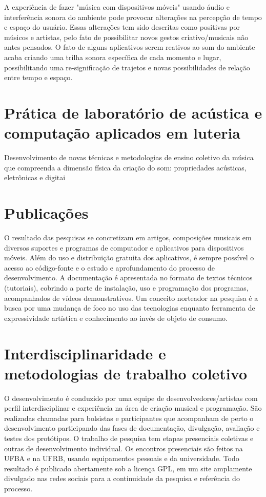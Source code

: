 \documentclass[
	12pt,				%
	openright,			%
	twoside,			%
	a4paper,			%
	english,			%
	french,				%
	spanish,			%
	brazil,				%
	]{abntex2}
\begin{document}
A experiência de fazer "música com dispositivos móveis"\cite{brinkmann2012making} usando áudio e interferência sonora do ambiente pode provocar alterações na percepção de tempo e espaço do usuário. Essas alterações tem sido descritas como positivas por músicos e artistas, pelo fato de possibilitar novos gestos criativo/musicais não antes pensados. O fato de alguns aplicativos serem reativos ao som do ambiente acaba criando uma trilha sonora específica de cada momento e lugar, possibilitando uma re-significação de trajetos e novas possibilidades de relação entre tempo e espaço.

\section{Prática de laboratório de acústica e computação aplicados em luteria}

Desenvolvimento de novas técnicas e metodologias de ensino coletivo da música que compreenda a dimensão física da criação do som: propriedades acústicas, eletrônicas e digitai

\section{Publicações}

O resultado das pesquisas se concretizam em artigos, composições musicais em diversos suportes e programas de computador e aplicativos para dispositivos móveis. Além do uso e distribuição gratuita dos aplicativos, é sempre possível o acesso ao código-fonte e o estudo e aprofundamento do processo de desenvolvimento. A documentação é apresentada no formato de textos técnicos (tutoriais), cobrindo a parte de instalação, uso e programação dos programas, acompanhados de vídeos demonstrativos. Um conceito norteador na pesquisa é a busca por uma  mudança de foco no uso das tecnologias enquanto ferramenta de expressividade artística e conhecimento ao invés de objeto de consumo.

\section{Interdisciplinaridade e metodologias de trabalho coletivo}

O desenvolvimento é conduzido por uma equipe de desenvolvedores/artistas com perfil interdisciplinar e experiência na área de criação musical e programação. São realizadas chamadas para bolsistas e participantes que acompanham de perto o desenvolvimento participando das fases de documentação, divulgação, avaliação e testes dos protótipos. O trabalho de pesquisa tem etapas presenciais coletivas e outras de desenvolvimento individual. Os encontros presenciais são feitos na UFBA e na UFRB, usando equipamentos pessoais e da universidade. Todo resultado é publicado abertamente sob a licença GPL, em um site amplamente divulgado nas redes sociais para a continuidade da pesquisa e referência do processo.
\end{document}
